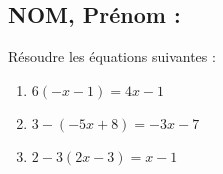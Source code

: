 \documentclass[a4paper,11pt,exos]{nsi} %
\begin{document}
\subsection*{NOM, Prénom : \dotfill} 


\maketitle




\begin{exercice}
Résoudre les équations suivantes :
\begin{multicols}{3}
	\begin{enumerate}
		\item $6(-x-1)=4x-1$
        \item $3-(-5x+8)=-3x-7$
		\item $2-3(2x-3)=x-1$
	\end{enumerate}
\end{multicols}

\end{exercice}

\end{document}
